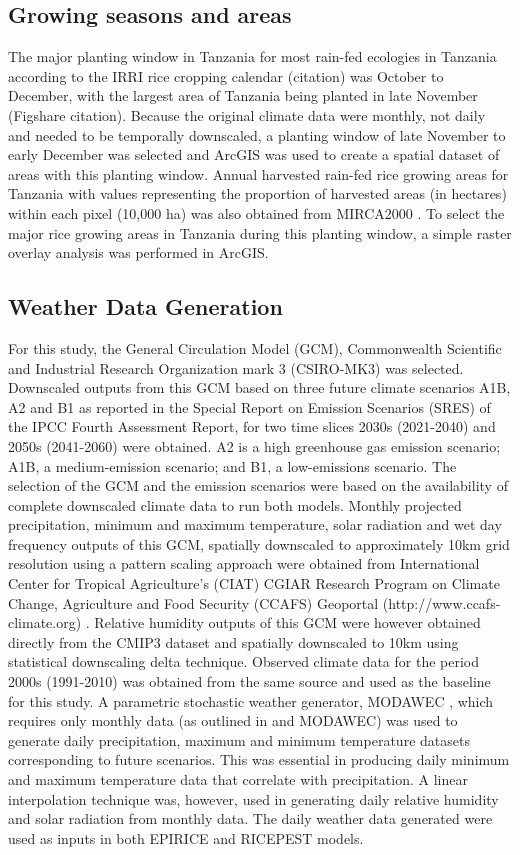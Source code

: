 \documentclass[preprint,12pt]{elsarticle}
\begin{document}
\subsection{Growing seasons and areas}
The major planting window in Tanzania for most rain-fed ecologies in Tanzania according to the IRRI rice cropping calendar (citation) was October to December, with the largest area of Tanzania being planted in late November (Figshare citation). Because the original climate data were monthly, not daily and needed to be temporally downscaled, a planting window of late November to early December was selected and ArcGIS was used to create a spatial dataset of areas with this planting window. Annual harvested rain-fed rice growing areas for Tanzania with values representing the proportion of harvested areas (in hectares) within each pixel (10,000 ha) was also obtained from MIRCA2000 \cite{Portmann2010}. To select the major rice growing areas in Tanzania during this planting window, a simple raster overlay analysis was performed in ArcGIS.

\subsection{Weather Data Generation}
For this study, the General Circulation Model (GCM), Commonwealth Scientific and Industrial Research Organization mark 3 (CSIRO-MK3) was selected. Downscaled outputs from this GCM based on three future climate scenarios A1B, A2 and B1 as reported in the Special Report on Emission Scenarios (SRES) of the IPCC Fourth Assessment Report, for two time slices 2030s (2021-2040) and 2050s (2041-2060) were obtained. A2 is a high greenhouse gas emission scenario; A1B, a medium-emission scenario; and B1, a low-emissions scenario. The selection of the GCM and the emission scenarios were based on the availability of complete downscaled climate data to run both models. Monthly projected precipitation, minimum and maximum temperature, solar radiation and wet day frequency outputs of this GCM, spatially downscaled to approximately 10km grid resolution using a pattern scaling approach were obtained from International Center for Tropical Agriculture's (CIAT) CGIAR Research Program on Climate Change, Agriculture and Food Security (CCAFS) Geoportal (http://www.ccafs-climate.org) \cite{Jones2009}. Relative humidity outputs of this GCM were however obtained directly from the CMIP3 dataset and spatially downscaled to 10km using statistical downscaling delta technique. Observed climate data for the period 2000s (1991-2010) was obtained from the same source and used as the baseline for this study. A parametric stochastic weather generator, MODAWEC \cite{Liu2009}, which requires only monthly data (as outlined in \citet{Geng1986} and MODAWEC) was used to generate daily precipitation, maximum and minimum temperature datasets corresponding to future scenarios. This was essential in producing daily minimum and maximum temperature data that correlate with precipitation. A linear interpolation technique was, however, used in generating daily relative humidity and solar radiation from monthly data. The daily weather data generated were used as inputs in both EPIRICE and RICEPEST models.
\end{document}
